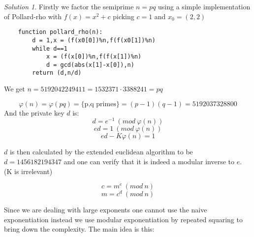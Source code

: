 \documentclass[a4paper,twoside=false,abstract=false,numbers=noenddot,
titlepage=false,headings=small,parskip=half,version=last]{scrartcl}
\theoremstyle{definition}
\theoremstyle{remark}
\newtheorem*{solution}{Solution}
\begin{document}
\begin{solution}
Firstly we factor the semiprime $n=pq$ using a simple implementation of
Pollard-rho with $f(x)=x^2+c$ picking $c=1$ and $x_0=(2,2)$

\begin{verbatim}
    function pollard_rho(n):
        d = 1,x = (f(x0[0])%n,f(f(x0[1])%n)
        while d==1
            x = (f(x[0])%n,f(f(x[1])%n)
            d = gcd(abs(x[1]-x[0]),n)
        return (d,n/d)
\end{verbatim}

We get $n=5192042249411=1532371 \cdot 3388241 = pq$

\begin{equation*}
    \varphi(n)=\varphi(pq)=\{\mbox{p,q primes}\}=(p-1)(q-1) = 5192037328800
\end{equation*}
And the private key $d$ is:
\begin{equation*}
    d=e^{-1} \ (mod \ \varphi(n))
\end{equation*}
\begin{equation*}
    ed=1 \ (mod \ \varphi(n))
\end{equation*}
\begin{equation*}
    ed - K\varphi(n)=1
\end{equation*}

$d$ is then calculated by the extended euclidean algorithm to be
\underline{$d=1456182194347$} and one can verify that it is indeed a modular inverse to
$e$. (K is irrelevant)

\begin{equation} \label{eq:encrypt}
    c=m^e \ (mod \ n)
\end{equation}
\begin{equation} \label{eq:decrypt}
    m=c^d \ (mod \ n)
\end{equation}

Since we are dealing with large exponents one cannot use the naive exponentiation 
instead we use modular exponentiation by repeated squaring to bring down the
complexity. The main idea is this:



\end{solution}
\end{document}
